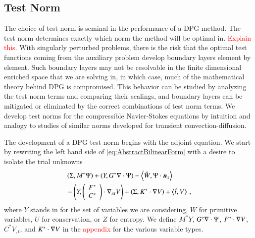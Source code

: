 \documentclass[preprint,12pt]{elsarticle}
\begin{document}
%                                                                                            
%                                                                                            
%      
\subsection{Test Norm}
The choice of test norm is seminal in the performance of a DPG method.
The test norm determines exactly which norm the method will be optimal in. \textcolor{red}{Explain this.}
With singularly perturbed problems, there is the risk that the optimal test functions coming from the auxiliary problem develop boundary layers
element by element. 
Such boundary layers may not be resolvable in the finite dimensional enriched space that we are solving in, in which case,
much of the mathematical theory behind DPG is compromised.
This behavior can be studied by analyzing the test norm terms and comparing their scalings, and boundary layers
can be mitigated or eliminated by the correct combinations of test norm terms.
We develop test norms for the compressible Navier-Stokes equations by intuition and analogy to studies of similar norms
developed for transient convection-diffusion.

The development of a DPG test norm begins with the adjoint equation.
We start by rewriting the left hand side of \eqref{eq:AbstractBilinearForm} with a desire to isolate the trial unknowns
\begin{align*}
&\left( \Sigma,M^*\Psi \right)
+\left( Y,G^*\nabla\cdot\Psi \right)
-\left\langle \hat W,\Psi\cdot\boldsymbol n_x \right\rangle\\
&-\left( Y,\left( \begin{array}{c} F^*\\ C^*\\ \end{array} \right)\cdot\nabla_{xt} V \right)
+\left( \Sigma,K^*\cdot\nabla V \right)
+\left\langle \hat t,V \right\rangle\,,
\end{align*}
where $Y$ stands in for the set of variables we are considering, $W$ for primitive variables, $U$ for conservation, or $Z$ for entropy.
We define $M^*Y$, $G^*\nabla\cdot\Psi$, $F^*\cdot\nabla V$, $C^*V_{,t}$, and $K^*\cdot\nabla V$ in the \textcolor{red}{appendix} for the various variable types.
\end{document}
